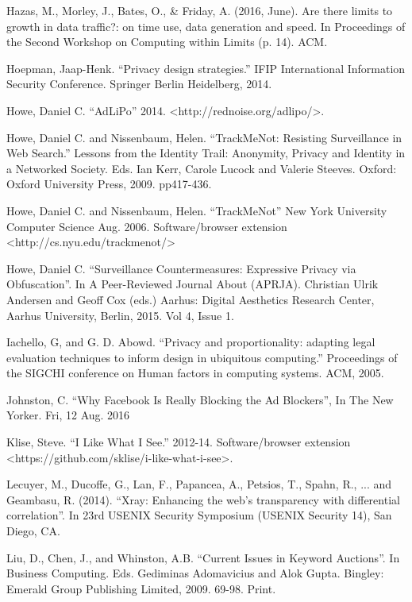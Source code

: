 \documentclass[conference]{IEEEtran}
\begin{document}
\begin{thebibliography}{99}
 Hazas, M., Morley, J., Bates, O., \& Friday, A. (2016, June). Are there limits to growth in data traffic?: on time use, data generation and speed. In Proceedings of the Second Workshop on Computing within Limits (p. 14). ACM.

 Hoepman, Jaap-Henk. ``Privacy design strategies.'' IFIP International Information Security Conference. Springer Berlin Heidelberg, 2014.

 Howe, Daniel C. ``AdLiPo'' 2014. <http://rednoise.org/adlipo/>.

 Howe, Daniel C. and Nissenbaum, Helen. ``TrackMeNot: Resisting Surveillance in Web Search.'' Lessons from the Identity Trail: Anonymity, Privacy and Identity in a Networked Society. Eds. Ian Kerr, Carole Lucock and Valerie Steeves. Oxford: Oxford University Press, 2009. pp417-436.

 Howe, Daniel C. and Nissenbaum, Helen. ``TrackMeNot'' New York University Computer Science Aug. 2006. Software/browser extension <http://cs.nyu.edu/trackmenot/>

 Howe, Daniel C. ``Surveillance Countermeasures: Expressive Privacy via Obfuscation''. In A Peer-Reviewed Journal About (APRJA). Christian Ulrik Andersen and Geoff Cox (eds.) Aarhus: Digital Aesthetics Research Center, Aarhus University, Berlin, 2015. Vol 4, Issue 1.

 Iachello, G, and G. D. Abowd. ``Privacy and proportionality: adapting legal evaluation techniques to inform design in ubiquitous computing.'' Proceedings of the SIGCHI conference on Human factors in computing systems. ACM, 2005.

 Johnston, C. ``Why Facebook Is Really Blocking the Ad Blockers'', In The New Yorker. Fri, 12 Aug. 2016

 Klise, Steve. ``I Like What I See.'' 2012-14. Software/browser extension <https://github.com/sklise/i-like-what-i-see>.

 Lecuyer, M., Ducoffe, G., Lan, F., Papancea, A., Petsios, T., Spahn, R., ... and Geambasu, R. (2014). ``Xray: Enhancing the web's transparency with differential correlation''. In 23rd USENIX Security Symposium (USENIX Security 14), San Diego, CA.

 Liu, D., Chen, J., and Whinston, A.B. ``Current Issues in Keyword Auctions''. In Business Computing. Eds. Gediminas Adomavicius and Alok Gupta. Bingley: Emerald Group Publishing Limited, 2009. 69-98. Print.


\end{thebibliography}
\end{document}
